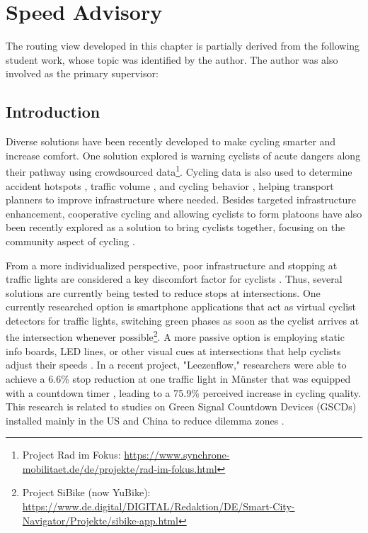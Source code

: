 \chapter{Speed Advisory}\label{ch:app}

\begin{Summary}
The routing view developed in this chapter is partially derived from the following student work, whose topic was identified by the author. The author was also involved as the primary supervisor:

\cite{pickhardt_2022} 
\end{Summary}

\section{Introduction}

Diverse solutions have been recently developed to make cycling smarter and increase comfort. One solution explored is warning cyclists of acute dangers along their pathway using crowdsourced data\footnote{Project Rad im Fokus: \url{https://www.synchrone-mobilitaet.de/de/projekte/rad-im-fokus.html}}. Cycling data is also used to determine accident hotspots \cite{von_stulpnagel_crash_2022}, traffic volume \cite{lissner_modeling_2018}, and cycling behavior \cite{lisner_gps-data_2020}, helping transport planners to improve infrastructure where needed. Besides targeted infrastructure enhancement, cooperative cycling and allowing cyclists to form platoons have also been recently explored as a solution to bring cyclists together, focusing on the community aspect of cycling \cite{cespedes_group_2019, meng_connected_2022}.

From a more individualized perspective, poor infrastructure and stopping at traffic lights are considered a key discomfort factor for cyclists \cite{otto_framework_2023}. Thus, several solutions are currently being tested to reduce stops at intersections. One currently researched option is smartphone applications that act as virtual cyclist detectors for traffic lights, switching green phases as soon as the cyclist arrives at the intersection whenever possible\footnote{Project SiBike (now YuBike): \url{https://www.de.digital/DIGITAL/Redaktion/DE/Smart-City-Navigator/Projekte/sibike-app.html}}. A more passive option is employing static info boards, LED lines, or other visual cues at intersections that help cyclists adjust their speeds \cite{de_angelis_green_2019}. In a recent project, "Leezenflow," researchers were able to achieve a 6.6\% stop reduction at one traffic light in Münster that was equipped with a countdown timer \cite{brand_riding_2024}, leading to a 75.9\% perceived increase in cycling quality. This research is related to studies on Green Signal Countdown Devices (GSCDs) installed mainly in the US and China to reduce dilemma zones \cite{lum_before-and-after_2006, huang_evaluating_2014, ni_estimating_2014, chen_exploring_2015, islam_improved_2016}. 

